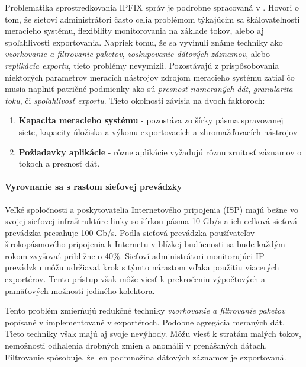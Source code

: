Problematika sprostredkovania IPFIX správ je podrobne spracovaná v \citep{rfc5982}. 
Hovori o tom, že sieťoví administrátori často celia problémom týkajúcim sa škálovateľnosti meracieho 
systému, flexibility monitorovania na základe tokov, alebo aj spoľahlivosti exportovania.
Napriek tomu, že sa vyvinuli známe techniky ako \emph{vzorkovanie a filtrovanie  paketov}, \emph{zoskupovanie 
dátových záznamov}, alebo \emph{replikácia exportu}, tieto problémy nevymizli.
Pozostávajú z prispôsobovania niektorých parametrov meracích nástrojov zdrojom meracieho 
systému zatiaľ čo musia naplniť patričné podmienky ako sú \emph{presnosť nameraných dát}, \emph{granularita 
toku}, či \emph{spoľahlivosť exportu}. Tieto okolnosti závisia na dvoch faktoroch:
\begin{enumerate}
 \item \textbf{Kapacita  meracieho systému} - pozostáva zo šírky pásma  spravovanej siete, kapacity 
 úložiska a výkonu exportovacích a zhromažďovacích nástrojov
 
 \item \textbf{Požiadavky aplikácie} - rôzne aplikácie vyžadujú rôznu zrnitosť záznamov o tokoch a presnosť dát.
\end{enumerate}


\paragraph{Vyrovnanie sa s rastom sieťovej prev\'adzky}

Veľké spoločnosti a poskytovatelia Internetového pripojenia (ISP) majú bežne vo svojej sieťovej 
infraštruktúre linky so šírkou pásma 10 Gb/s a ich celková sieťová prevádzka presahuje 100 Gb/s. 
Podla \citep{trafgrw} sieťová prevádzka používateľov širokopásmového pripojenia k
Internetu v blízkej budúcnosti sa bude každým rokom zvyšovať približne o 40\%. Sieťoví administrátori
monitorujúci IP prevádzku môžu udržiavať krok s týmto nárastom vďaka použitiu viacerých exportérov. 
Tento prístup však môže viesť k prekročeniu výpočtových a pamäťových možností jediného kolektora.

Tento problém zmierňujú redukčné techniky \emph{vzorkovanie a filtrovanie paketov} popísané v \citep{rfc5475}
implementované v exportéroch. Podobne agregácia meraných dát. Tieto techniky však majú aj svoje nevýhody. 
Môžu viesť k stratám malých tokov, nemožnosti odhalenia drobných zmien a anomálií v prenášaných dátach. 
Filtrovanie spôsobuje, že len podmnožina dátových záznamov je exportovaná.

